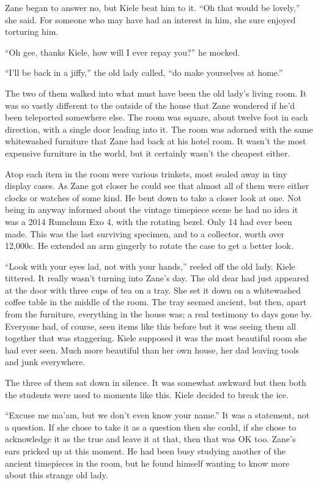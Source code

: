 Zane began to answer no, but Kiele beat him to it.  ``Oh that would be lovely,'' she said.  For someone who may have had an interest in him, she sure enjoyed torturing him.

``Oh gee, thanks Kiele, how will I ever repay you?'' he mocked.

``I'll be back in a jiffy,'' the old lady called, ``do make yourselves at home.''

The two of them walked into what must have been the old lady's living room.  It was so vastly different to the outside of the house that Zane wondered if he'd been teleported somewhere else.  The room was square, about twelve foot in each direction, with a single door leading into it.  The room was adorned with the same whitewashed furniture that Zane had back at his hotel room.  It wasn't the most expensive furniture in the world, but it certainly wasn't the cheapest either.

Atop each item in the room were various trinkets, most sealed away in tiny display cases.  As Zane got closer he could see that almost all of them were either clocks or watches of some kind.  He bent down to take a closer look at one.  Not being in anyway informed about the vintage timepiece scene he had no idea it was a 2014 Rumchum Exo 4, with the rotating bezel.  Only 14 had ever been made.  This was the last surviving specimen, and to a collector, worth over 12,000c.  He extended an arm gingerly to rotate the case to get a better look.

``Look with your eyes lad, not with your hands,'' reeled off the old lady.  Kiele tittered.  It really wasn't turning into Zane's day.  The old dear had just appeared at the door with three cups of tea on a tray.  She set it down on a whitewashed coffee table in the middle of the room.  The tray seemed ancient, but then, apart from the furniture, everything in the house was; a real testimony to days gone by.  Everyone had, of course, seen items like this before but it was seeing them all together that was staggering.  Kiele supposed it was the most beautiful room she had ever seen.  Much more beautiful than her own house, her dad leaving tools and junk everywhere.  

The three of them sat down in silence.  It was somewhat awkward but then both the students were used to moments like this.  Kiele decided to break the ice.

``Excuse me ma'am, but we don't even know your name.''  It was a statement, not a question.  If she chose to take it as a question then she could, if she chose to acknowledge it as the true and leave it at that, then that was OK too.  Zane's ears pricked up at this moment.  He had been busy studying another of the ancient timepieces in the room, but he found himself wanting to know more about this strange old lady.  

